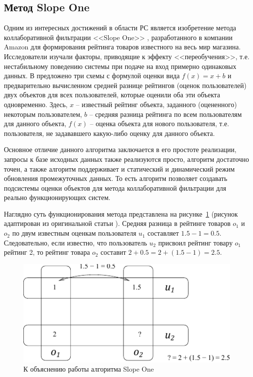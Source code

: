 \documentclass[a4paper,14pt,openany,final]{extreport} %
\def\oldcaption{} \let\oldcaption=\caption
\def\caption{\stepcounter{captionsnum}\oldcaption}
\begin{document}
\subsection{Метод Slope One}

Одним из интересных достижений в области РС является изобретение метода коллаборативной фильтрации <<Slope One>> \cite{slopeone}, разработанного в компании Amazon для формирования рейтинга товаров известного на весь мир магазина. Исследователи изучали факторы, приводящие к эффекту <<переобучения>>, т.е. нестабильному поведению системы при подаче на вход примерно одинаковых данных. В \cite{slopeone} предложено три схемы с формулой оценки вида $f(x)=x+b$ и предварительно вычисленном средней разнице рейтингов (оценок пользователей) двух объектов для всех пользователей, которые оценили оба эти объекта одновременно.  Здесь, $x$ -- известный рейтинг объекта, заданного (оцененного) некоторым пользователем, $b$ -- средняя разница рейтинга по всем пользователям для данного объекта, $f(x)$ -- оценка объекта для нового пользователя, т.е. пользователя, не задававшего какую-либо оценку для данного объекта.

Основное отличие данного алгоритма заключается в его простоте реализации, запросы к базе исходных данных также реализуются просто, алгоритм достаточно точен, а также алгоритм поддерживает и статический и динамический режим обновления промежуточных данных. То есть алгоритм позволяет создавать подсистемы оценки объектов для метода коллаборативной фильтрации для реально функционирующих систем.

Наглядно суть функционирования метода представлена на рисунке~\ref{fig:slope-exp} (рисунок адаптирован из оригинальной статьи \cite{slopeone}). Средняя разница в рейтинге товаров $o_1$ и $o_2$ по двум известным оценкам пользователя $u_1$ составляет $1.5-1 = 0.5$. Следовательно, если известно, что пользователь $u_2$ присвоил рейтинг товару $o_1$ рейтинг 2, то рейтинг товара $o_2$ составит $2+0.5=2+(1.5-1)=2.5$.

\begin{figure}[htb]
  \centering
  \includegraphics[width=0.7\linewidth]{slopeone.pdf}
  \caption{К объяснению работы алгоритма Slope One}
  \label{fig:slope-exp}
\end{figure}
\end{document}
